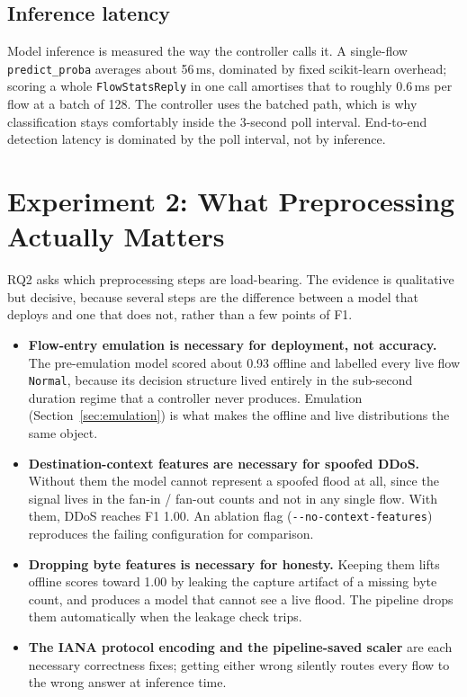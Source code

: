 \documentclass[11pt]{article}
\begin{document}
\subsection{Inference latency}
Model inference is measured the way the controller calls it. A single-flow
\texttt{predict\_proba} averages about 56\,ms, dominated by fixed scikit-learn overhead;
scoring a whole \texttt{FlowStatsReply} in one call amortises that to roughly 0.6\,ms per
flow at a batch of 128. The controller uses the batched path, which is why classification
stays comfortably inside the 3-second poll interval. End-to-end detection latency is
dominated by the poll interval, not by inference.

\section{Experiment 2: What Preprocessing Actually Matters}
RQ2 asks which preprocessing steps are load-bearing. The evidence is qualitative but
decisive, because several steps are the difference between a model that deploys and one
that does not, rather than a few points of F1.

\begin{itemize}
    \item \textbf{Flow-entry emulation is necessary for deployment, not accuracy.} The
    pre-emulation model scored about 0.93 offline and labelled every live flow
    \texttt{Normal}, because its decision structure lived entirely in the sub-second
    duration regime that a controller never produces. Emulation (Section~\ref{sec:emulation})
    is what makes the offline and live distributions the same object.
    \item \textbf{Destination-context features are necessary for spoofed DDoS.} Without
    them the model cannot represent a spoofed flood at all, since the signal lives in the
    fan-in / fan-out counts and not in any single flow. With them, DDoS reaches F1 1.00.
    An ablation flag (\texttt{-{}-no-context-features}) reproduces the failing configuration
    for comparison.
    \item \textbf{Dropping byte features is necessary for honesty.} Keeping them lifts
    offline scores toward 1.00 by leaking the capture artifact of a missing byte count,
    and produces a model that cannot see a live flood. The pipeline drops them
    automatically when the leakage check trips.
    \item \textbf{The IANA protocol encoding and the pipeline-saved scaler} are each
    necessary correctness fixes; getting either wrong silently routes every flow to the
    wrong answer at inference time.
\end{itemize}
\end{document}

